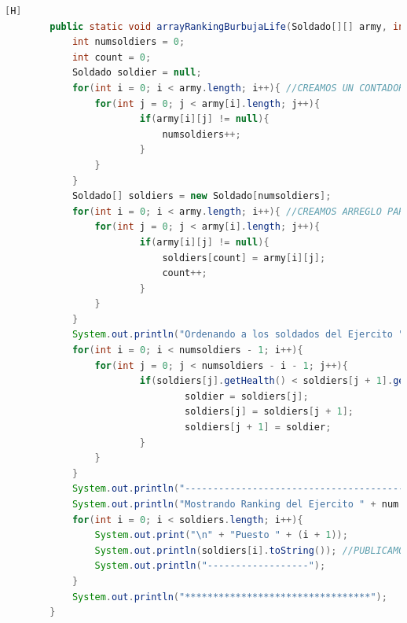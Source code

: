 \documentclass{article}
\begin{document}
	\begin{lstlisting}[language=java,caption={Las lineas de codigos del metodo creado:}][H]
		public static void arrayRankingBurbujaLife(Soldado[][] army, int num){
			int numsoldiers = 0;
			int count = 0;
			Soldado soldier = null;
			for(int i = 0; i < army.length; i++){ //CREAMOS UN CONTADOR PARA SABER EL NUMERO DE SOLDADOS DE ESTE EJERCITO Y DESPUES CREAR UN ARREGLO EL CUAL PODEAMOS DARLE ESTE TAMANO Y LO PODAMOS USAR PARA EL METODO BURBUJA
				for(int j = 0; j < army[i].length; j++){
						if(army[i][j] != null){
							numsoldiers++;
						}
				}
			}
			Soldado[] soldiers = new Soldado[numsoldiers];
			for(int i = 0; i < army.length; i++){ //CREAMOS ARREGLO PARA QUE LOS SOLDADOS SE TRASLADEN DE UN ARREGLO BIDIMENSIONAL A UNO UNIDIMENSIONAL PARA APLICAR EL METODO BURBUJA
				for(int j = 0; j < army[i].length; j++){
						if(army[i][j] != null){
							soldiers[count] = army[i][j];
							count++;
						}
				}
			}
			System.out.println("Ordenando a los soldados del Ejercito " + num + " por el metodo burbuja: ");//APLICAMOS EL METODO BURBUJA CON LOS PUNTOS DE VIDA
			for(int i = 0; i < numsoldiers - 1; i++){
				for(int j = 0; j < numsoldiers - i - 1; j++){
						if(soldiers[j].getHealth() < soldiers[j + 1].getHealth()){
								soldier = soldiers[j];
								soldiers[j] = soldiers[j + 1];
								soldiers[j + 1] = soldier;
						}
				}      
			}
			System.out.println("------------------------------------------");
			System.out.println("Mostrando Ranking del Ejercito " + num + " ..... ////// --->"); //DAMOS A CONOCER EL RANKING DE ESTE EJERCITO  EL CUAL LO PUBLICAMOS MEDIANTE PUESTOS 
			for(int i = 0; i < soldiers.length; i++){
				System.out.print("\n" + "Puesto " + (i + 1));
				System.out.println(soldiers[i].toString()); //PUBLICAMOS INFORMACION DE CADA SOLDADO
				System.out.println("------------------");
			}
			System.out.println("*********************************");
		}
	\end{lstlisting}
\end{document}
